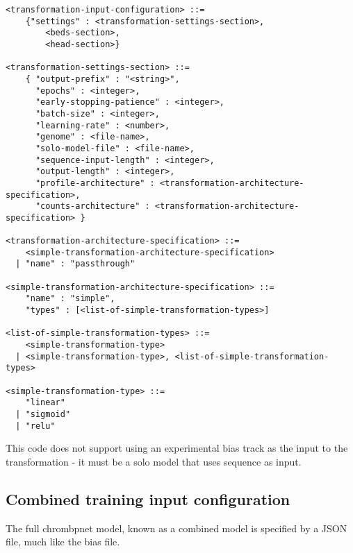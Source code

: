 \documentclass{article}
\begin{document}
\begin{lstlisting}
<transformation-input-configuration> ::=
    {"settings" : <transformation-settings-section>, 
        <beds-section>, 
        <head-section>}

<transformation-settings-section> ::=
    { "output-prefix" : "<string>", 
      "epochs" : <integer>, 
      "early-stopping-patience" : <integer>, 
      "batch-size" : <integer>, 
      "learning-rate" : <number>, 
      "genome" : <file-name>,
      "solo-model-file" : <file-name>,
      "sequence-input-length" : <integer>,
      "output-length" : <integer>,
      "profile-architecture" : <transformation-architecture-specification>, 
      "counts-architecture" : <transformation-architecture-specification> } 

<transformation-architecture-specification> ::= 
    <simple-transformation-architecture-specification>
  | "name" : "passthrough"

<simple-transformation-architecture-specification> ::= 
    "name" : "simple",
    "types" : [<list-of-simple-transformation-types>]

<list-of-simple-transformation-types> ::= 
    <simple-transformation-type>
  | <simple-transformation-type>, <list-of-simple-transformation-types>

<simple-transformation-type> ::= 
    "linear"
  | "sigmoid"
  | "relu"

\end{lstlisting}

This code does not support using an experimental bias track as the input to the 
transformation - it must be a solo model that uses sequence as input.

\subsection{Combined training input configuration}
The full chrombpnet model, known as a combined model is specified by a JSON file, 
much like the bias file.
\end{document}
